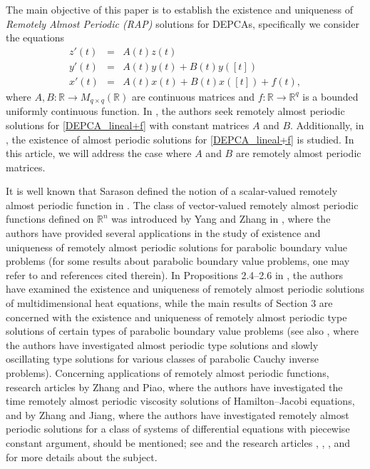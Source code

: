 \documentclass[english,,reqno]{amsart}
\numberwithin{equation}{section}
\theoremstyle{plain}
\theoremstyle{definition}
\theoremstyle{remark}
\begin{document}
The main objective of this paper is to establish the existence and uniqueness of \textit{Remotely Almost Periodic (RAP)} solutions for DEPCAs, specifically we consider the equations
\begin{eqnarray}
z'(t)&=& A(t)z(t) \label{DEPCA_A}\\
y'(t)&=& A(t)y(t)+B(t)y([t]) \label{DEPCA_lineal}\\
x'(t)&=& A(t)x(t)+B(t)x([t])+f(t), \label{DEPCA_lineal+f}
\end{eqnarray}
where $A, B:\mathbb{R}\rightarrow M_{q\times q}(\mathbb{R})$ are continuous matrices and $f:\mathbb{R}\rightarrow \mathbb{R}^q$ is a bounded uniformly continuous function. In \cite{zhang_depca}, the authors seek remotely almost periodic solutions for \eqref{DEPCA_lineal+f} with constant matrices $A$ and $B$.  Additionally, in \cite{yuan}, the existence of almost periodic solutions for \eqref{DEPCA_lineal+f} is studied.  
In this article, we will address the case where $A$ and $B$ are remotely almost periodic matrices.


It is well known that Sarason defined the notion of a scalar-valued remotely almost periodic function in \cite{sarason}. The class of vector-valued remotely almost periodic functions defined on $\mathbb{R}^n$ was introduced by Yang and Zhang in \cite{yang_zhang_RAP}, where the authors have provided several applications in the study of existence and uniqueness of remotely almost periodic solutions for parabolic boundary value problems (for some results about parabolic boundary value problems, one may refer to \cite{kamenskii_2020,kamenskii_2021,li_yang} and references cited therein). In Propositions 2.4--2.6 in \cite{xu_li_guo}, the authors have examined the existence and uniqueness of remotely almost periodic solutions of multidimensional heat equations, while the main results of Section 3 are concerned with the existence and uniqueness of remotely almost periodic type solutions of certain types of parabolic boundary value problems (see also \cite{yang_zhang_cauchy,yang_zhang_slowly}, where the authors have investigated almost periodic type solutions and slowly oscillating type solutions for various classes of parabolic Cauchy inverse problems). Concerning applications of remotely almost periodic functions, research articles \cite{zhang_piao} by Zhang and Piao, where the authors have investigated the time remotely almost periodic viscosity solutions of Hamilton--Jacobi equations, and \cite{zhang_depca} by Zhang and Jiang, where the authors have investigated remotely almost periodic solutions for a class of systems of differential equations with piecewise constant argument, should be mentioned; see \cite{wiener_book} and the research articles \cite{chiu_pinto_periodic}, %
\cite{coronel_dichotomies}, \cite{kostic_velinov}, %
 and \cite{torres_castillo} for more details about the subject.
\end{document}
